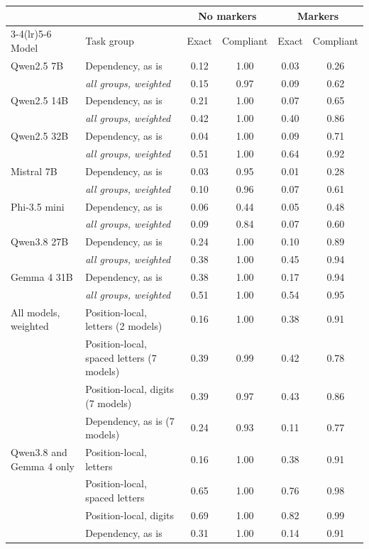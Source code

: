\begin{tabular}{ll cc cc}
\toprule
& & \multicolumn{2}{c}{No markers} & \multicolumn{2}{c}{Markers} \\
\cmidrule(lr){3-4}\cmidrule(lr){5-6}
Model & Task group & Exact & Compliant & Exact & Compliant \\
\midrule
Qwen2.5 7B & Dependency, as is & 0.12 & 1.00 & 0.03 & 0.26 \\
 & \emph{all groups, weighted} & 0.15 & 0.97 & 0.09 & 0.62 \\
\midrule
Qwen2.5 14B & Dependency, as is & 0.21 & 1.00 & 0.07 & 0.65 \\
 & \emph{all groups, weighted} & 0.42 & 1.00 & 0.40 & 0.86 \\
\midrule
Qwen2.5 32B & Dependency, as is & 0.04 & 1.00 & 0.09 & 0.71 \\
 & \emph{all groups, weighted} & 0.51 & 1.00 & 0.64 & 0.92 \\
\midrule
Mistral 7B & Dependency, as is & 0.03 & 0.95 & 0.01 & 0.28 \\
 & \emph{all groups, weighted} & 0.10 & 0.96 & 0.07 & 0.61 \\
\midrule
Phi-3.5 mini & Dependency, as is & 0.06 & 0.44 & 0.05 & 0.48 \\
 & \emph{all groups, weighted} & 0.09 & 0.84 & 0.07 & 0.60 \\
\midrule
Qwen3.8 27B & Dependency, as is & 0.24 & 1.00 & 0.10 & 0.89 \\
 & \emph{all groups, weighted} & 0.38 & 1.00 & 0.45 & 0.94 \\
\midrule
Gemma 4 31B & Dependency, as is & 0.38 & 1.00 & 0.17 & 0.94 \\
 & \emph{all groups, weighted} & 0.51 & 1.00 & 0.54 & 0.95 \\
\midrule
All models, weighted & Position-local, letters (2 models) & 0.16 & 1.00 & 0.38 & 0.91 \\
 & Position-local, spaced letters (7 models) & 0.39 & 0.99 & 0.42 & 0.78 \\
 & Position-local, digits (7 models) & 0.39 & 0.97 & 0.43 & 0.86 \\
 & Dependency, as is (7 models) & 0.24 & 0.93 & 0.11 & 0.77 \\
\midrule
Qwen3.8 and Gemma 4 only & Position-local, letters & 0.16 & 1.00 & 0.38 & 0.91 \\
 & Position-local, spaced letters & 0.65 & 1.00 & 0.76 & 0.98 \\
 & Position-local, digits & 0.69 & 1.00 & 0.82 & 0.99 \\
 & Dependency, as is & 0.31 & 1.00 & 0.14 & 0.91 \\
\bottomrule
\end{tabular}
